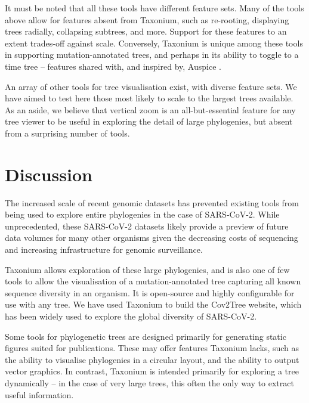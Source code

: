 It must be noted that all these tools have different feature sets. Many of the tools above allow for features absent from Taxonium, such as re-rooting, displaying trees radially, collapsing subtrees, and more. Support for these features to an extent trades-off against scale. Conversely, Taxonium is unique among these tools in supporting mutation-annotated trees, and perhaps in its ability to toggle to a time tree -- features shared with, and inspired by, Auspice \citep{nextstrain}.

An array of other tools for tree visualisation exist, with diverse feature sets. We have aimed to test here those most likely to scale to the largest trees available. As an aside, we believe that vertical zoom is an all-but-essential feature for any tree viewer to be useful in exploring the detail of large phylogenies, but absent from a surprising number of tools.

\section*{Discussion}\label{s:discussion}

The increased scale of recent genomic datasets has prevented existing tools from being used to explore entire phylogenies in the case of SARS-CoV-2. While unprecedented, these SARS-CoV-2 datasets likely provide a preview of future data volumes for many other organisms given the decreasing costs of sequencing and increasing infrastructure for genomic surveillance.

Taxonium allows exploration of these large phylogenies, and is also one of few tools to allow the visualisation of a mutation-annotated tree capturing all known sequence diversity in an organism. It is open-source and highly configurable for use with any tree. We have used Taxonium to build the Cov2Tree website, which has been widely used to explore the global diversity of SARS-CoV-2.

Some tools for phylogenetic trees are designed primarily for generating static figures suited for publications. These may offer features Taxonium lacks, such as the ability to visualise phylogenies in a circular layout, and the ability to output vector graphics. In contrast, Taxonium is intended primarily for exploring a tree dynamically -- in the case of very large trees, this often the only way to extract useful information.


